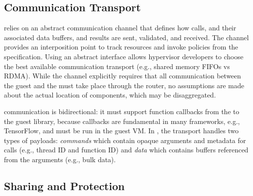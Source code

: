 
\graphicspath{{images/}}

\subsection{Communication Transport}
\label{s:design_transport}

\AvA relies on an abstract communication channel that defines how
calls, and their associated data buffers, and results are sent, validated, and received.
The channel provides an interposition point to track resources and invoke policies from the \Lapis specification.
Using an abstract interface allows hypervisor developers to choose the best available communication transport
(e.g., shared memory FIFOs vs RDMA).
While the channel explicitly requires that all communication between the guest
and the \worker must take place through the router, no assumptions are made
about the actual location of components, which may be
disaggregated.


\AvA communication is bidirectional: it must support function callbacks from the \worker to the guest library, because
callbacks are fundamental in many frameworks, e.g., TensorFlow,
and must be run in the guest VM. %
In \AvA, the transport handles two types of payloads: \emph{commands} which contain opaque arguments and metadata for calls (e.g., thread ID and function ID) and \emph{data} which contains buffers referenced from the arguments (e.g., bulk data).

\subsection{Sharing and Protection}
\label{s:protection}

